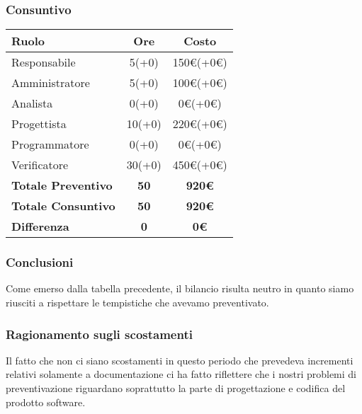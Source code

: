 {{{{{{{{{{{	
	\subsubsection{Consuntivo}\label{ConsuntivoTerzoPeriodoDiProgettazioneDiDettaglioCodificaIncrementiCosto}
	
	\quad
	\def\tabularxcolumn#1{m{#1}}
	{
		\begin{center}
			\renewcommand{\arraystretch}{1.4}
			\begin{tabularx}{10cm}{|X|c|c|}
				\hline
				\rowcolor{airforceblue}
				\textbf{Ruolo} & \textbf{Ore} & \textbf{Costo}\\
				\hline
				Responsabile & 5(+0) & 150\euro(+0\euro)\\
				\hline
				Amministratore & 5(+0) & 100\euro(+0\euro)\\
				\hline
				Analista & 0(+0) & 0\euro(+0\euro)\\
				\hline
				Progettista & 10(+0) & 220\euro(+0\euro)\\
				\hline
				Programmatore & 0(+0) & 0\euro(+0\euro)\\
				\hline
				Verificatore & 30(+0) & 450\euro(+0\euro)\\
				\hline
				\textbf{Totale Preventivo} & \textbf{50} & \textbf{920\euro}\\
				\hline
				\textbf{Totale Consuntivo} & \textbf{50} & \textbf{920\euro}\\
				\hline
				\textbf{Differenza} & \textbf{0} & \textbf{0\euro}
			\end{tabularx}
		\end{center}
		
		\subsubsection{Conclusioni}\label{ConsuntivoTerzoPeriodoDiProgettazioneDiDettaglioCodificaConclusioni}
		Come emerso dalla tabella precedente, il bilancio risulta neutro in quanto siamo riusciti a rispettare le tempistiche che avevamo preventivato.
		
				
		\subsubsection{Ragionamento sugli scostamenti}\label{ConsuntivoTerzoPeriodoDiProgettazioneDiDettaglioCodificaRagionamentoScostamenti}
		Il fatto che non ci siano scostamenti in questo periodo che prevedeva incrementi relativi solamente a documentazione ci ha fatto riflettere che i nostri problemi di preventivazione riguardano soprattutto la parte di progettazione e codifica del prodotto software.
		
}}}}}}}}}}}}
